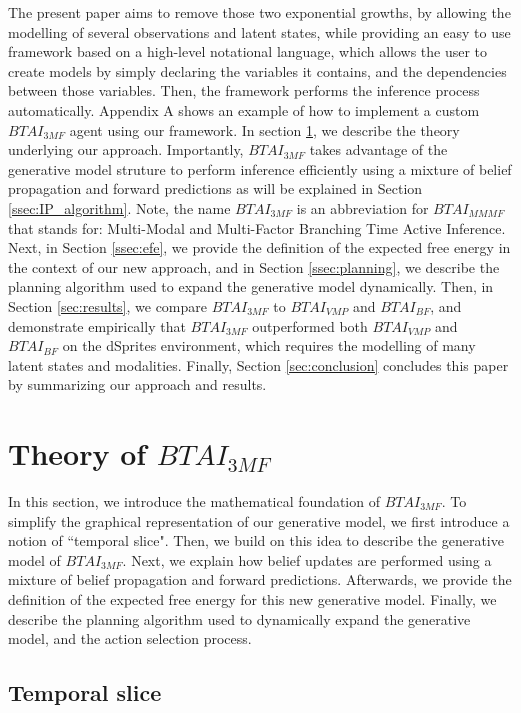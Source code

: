 \documentclass[twoside,11pt]{article}
\begin{document}
The present paper aims to remove those two exponential growths, by allowing the modelling of several observations and latent states, while providing an easy to use framework based on a high-level notational language, which allows the user to create models by simply declaring the variables it contains, and the dependencies between those variables. Then, the framework performs the inference process automatically. Appendix A shows an example of how to implement a custom $BTAI_{3MF}$ agent using our framework. In section \ref{sec:btai_3mf}, we describe the theory underlying our approach. Importantly, $BTAI_{3MF}$ takes advantage of the generative model struture to perform inference efficiently using a mixture of belief propagation \citep{BP_and_DC, believe,belief_propagation} and forward predictions as will be explained in Section \ref{ssec:IP_algorithm}. Note, the name $BTAI_{3MF}$ is an abbreviation for  $BTAI_{MMMF}$ that stands for: Multi-Modal and Multi-Factor Branching Time Active Inference. Next, in Section \ref{ssec:efe}, we provide the definition of the expected free energy in the context of our new approach, and in Section \ref{ssec:planning}, we describe the planning algorithm used to expand the generative model dynamically. Then, in Section \ref{sec:results}, we compare $BTAI_{3MF}$ to $BTAI_{VMP}$ and $BTAI_{BF}$, and demonstrate empirically that $BTAI_{3MF}$ outperformed both $BTAI_{VMP}$ and $BTAI_{BF}$ on the dSprites environment, which requires the modelling of many latent states and modalities. Finally, Section \ref{sec:conclusion} concludes this paper by summarizing our approach and results.

\section{Theory of $BTAI_{3MF}$} \label{sec:btai_3mf}

In this section, we introduce the mathematical foundation of $BTAI_{3MF}$. To simplify the graphical representation of our generative model, we first introduce a notion of ``temporal slice". Then, we build on this idea to describe the generative model of $BTAI_{3MF}$. Next, we explain how belief updates are performed using a mixture of belief propagation and forward predictions. Afterwards, we provide the definition of the expected free energy for this new generative model. Finally, we describe the planning algorithm used to dynamically expand the generative model, and the action selection process.

\subsection{Temporal slice} \label{ssec:temporal_slice}
\end{document}
